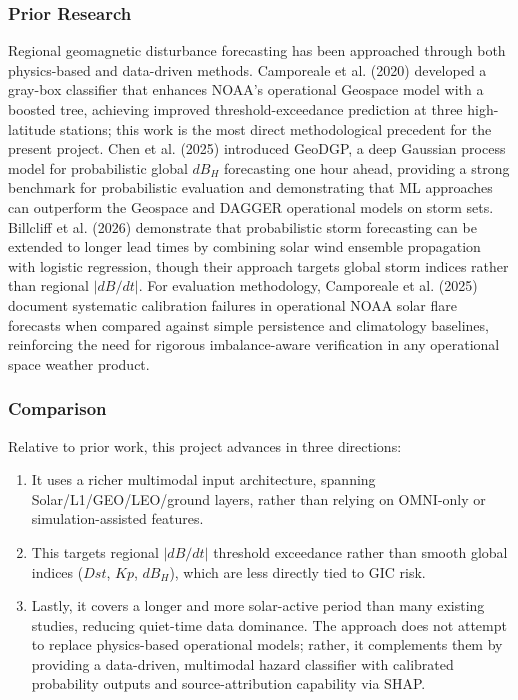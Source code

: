 \documentclass{article}
\begin{document}
\subsubsection*{Prior Research}
Regional geomagnetic disturbance forecasting has been approached through both physics-based and data-driven methods. Camporeale et al. (2020) developed a gray-box classifier that enhances NOAA's operational Geospace model with a boosted tree, achieving improved threshold-exceedance prediction at three high-latitude stations; this work is the most direct methodological precedent for the present project. Chen et al. (2025) introduced GeoDGP, a deep Gaussian process model for probabilistic global $dB_H$ forecasting one hour ahead, providing a strong benchmark for probabilistic evaluation and demonstrating that ML approaches can outperform the Geospace and DAGGER operational models on storm sets. Billcliff et al. (2026) demonstrate that probabilistic storm forecasting can be extended to longer lead times by combining solar wind ensemble propagation with logistic regression, though their approach targets global storm indices rather than regional $|dB/dt|$. For evaluation methodology, Camporeale et al. (2025) document systematic calibration failures in operational NOAA solar flare forecasts when compared against simple persistence and climatology baselines, reinforcing the need for rigorous imbalance-aware verification in any operational space weather product.

\subsubsection*{Comparison}
Relative to prior work, this project advances in three directions:
\begin{enumerate}
  \item It uses a richer multimodal input architecture, spanning Solar/L1/GEO/LEO/ground layers, rather than relying on OMNI-only or simulation-assisted features.
  \item This targets regional $|dB/dt|$ threshold exceedance rather than smooth global indices ($Dst$, $Kp$, $dB_H$), which are less directly tied to GIC risk.
  \item  Lastly, it covers a longer and more solar-active period than many existing studies, reducing quiet-time data dominance. The approach does not attempt to replace physics-based operational models; rather, it complements them by providing a data-driven, multimodal hazard classifier with calibrated probability outputs and source-attribution capability via SHAP. 
\end{enumerate}
\end{document}
